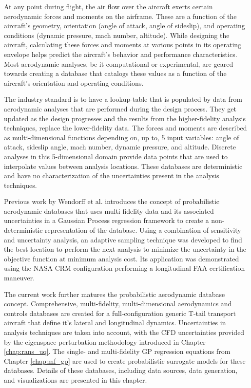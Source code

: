 At any point during flight, the air flow over the aircraft exerts certain aerodynamic forces and moments on the airframe.
These are a function of the aircraft's geometry, orientation (angle of attack, angle of sideslip), and operating conditions (dynamic pressure, mach number, altitude).
While designing the aircraft, calculating these forces and moments at various points in its operating envelope helps predict the aircraft's behavior and performance characteristics.
Most aerodynamic analyses, be it computational or experimental, are geared towards creating a database that catalogs these values as a function of the aircraft's orientation and operating conditions.

The industry standard is to have a lookup-table that is populated by data from aerodynamic analyses that are performed during the design process.
They get updated as the design progresses and the results from the higher-fidelity analysis techniques, replace the lower-fidelity data.
The forces and moments are described as multi-dimensional functions depending on, up to, 5 input variables: angle of attack, sideslip angle, mach number, dynamic pressure, and altitude.
Discrete analyses in this 5-dimensional domain provide data points that are used to interpolate values between analysis locations.
These databases are deterministic and have no characterization of the uncertainties present in the analysis techniques. 

Previous work by Wendorff et al. \cite{wendorff_combining_2016} introduces the concept of probabilistic aerodynamic databases that uses multi-fidelity data and its associated uncertainties in a Gaussian Process regression framework to create a non-deterministic representation of the database.
Using a combination of sensitivity and uncertainty analysis, an adaptive sampling technique was developed to find the best location to perform the next analysis to minimize the uncertainty in the objective function at minimum analysis cost.
Its application was demonstrated using the NASA CRM configuration performing a longitudinal FAA certification maneuver. 

The current work further matures the probabilistic aerodynamic database concept.
Comprehensive, multi-fidelity, multi-dimensional aerodynamics and controls databases are created for a full-configuration generic T-tail transport aircraft that define it's lateral and longitudinal dynamics.
Uncertainties in analysis techniques are taken into account, with the CFD uncertainties provided by the eigenspace perturbation methodology introduced in Chapter \ref{chap:rans_uq}.
The single- and multi-fidelity GP regression equations from Chapter \ref{chap:mf_gp} are used to create probabilistic surrogate models for these databases. 
Details of these databases, including data sources, data generation, and visualizations are presented in this chapter. 